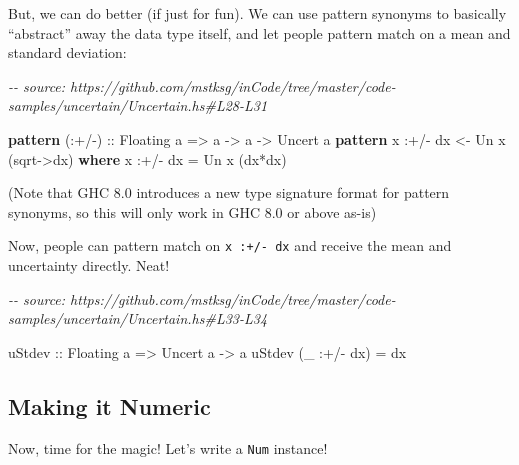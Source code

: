 \documentclass[]{article}
\newenvironment{Shaded}{}{}
\newcommand{\CommentTok}[1]{\textcolor[rgb]{0.38,0.63,0.69}{\textit{#1}}}
\newcommand{\DataTypeTok}[1]{\textcolor[rgb]{0.56,0.13,0.00}{#1}}
\newcommand{\FunctionTok}[1]{\textcolor[rgb]{0.02,0.16,0.49}{#1}}
\newcommand{\KeywordTok}[1]{\textcolor[rgb]{0.00,0.44,0.13}{\textbf{#1}}}
\newcommand{\NormalTok}[1]{#1}
\newcommand{\OperatorTok}[1]{\textcolor[rgb]{0.40,0.40,0.40}{#1}}
\newcommand{\OtherTok}[1]{\textcolor[rgb]{0.00,0.44,0.13}{#1}}
\begin{document}
But, we can do better (if just for fun). We can use pattern synonyms to
basically ``abstract'' away the data type itself, and let people pattern match
on a mean and standard deviation:

\begin{Shaded}
\begin{Highlighting}[]
\CommentTok{{-}{-} source: https://github.com/mstksg/inCode/tree/master/code{-}samples/uncertain/Uncertain.hs\#L28{-}L31}

\KeywordTok{pattern}\OtherTok{ (:+/{-}) ::} \DataTypeTok{Floating}\NormalTok{ a }\OtherTok{=>}\NormalTok{ a }\OtherTok{{-}>}\NormalTok{ a }\OtherTok{{-}>} \DataTypeTok{Uncert}\NormalTok{ a}
\KeywordTok{pattern}\NormalTok{ x }\OperatorTok{:+/{-}}\NormalTok{ dx }\OtherTok{<{-}} \DataTypeTok{Un}\NormalTok{ x (}\FunctionTok{sqrt}\OtherTok{{-}>}\NormalTok{dx)}
  \KeywordTok{where}
\NormalTok{    x }\OperatorTok{:+/{-}}\NormalTok{ dx }\OtherTok{=} \DataTypeTok{Un}\NormalTok{ x (dx}\OperatorTok{*}\NormalTok{dx)}
\end{Highlighting}
\end{Shaded}

(Note that GHC 8.0 introduces a new type signature format for pattern synonyms,
so this will only work in GHC 8.0 or above as-is)

Now, people can pattern match on \texttt{x\ :+/-\ dx} and receive the mean and
uncertainty directly. Neat!

\begin{Shaded}
\begin{Highlighting}[]
\CommentTok{{-}{-} source: https://github.com/mstksg/inCode/tree/master/code{-}samples/uncertain/Uncertain.hs\#L33{-}L34}

\OtherTok{uStdev ::} \DataTypeTok{Floating}\NormalTok{ a }\OtherTok{=>} \DataTypeTok{Uncert}\NormalTok{ a }\OtherTok{{-}>}\NormalTok{ a}
\NormalTok{uStdev (\_ }\OperatorTok{:+/{-}}\NormalTok{ dx) }\OtherTok{=}\NormalTok{ dx}
\end{Highlighting}
\end{Shaded}

\hypertarget{making-it-numeric}{%
\subsection{Making it Numeric}\label{making-it-numeric}}

Now, time for the magic! Let's write a \texttt{Num} instance!
\end{document}
